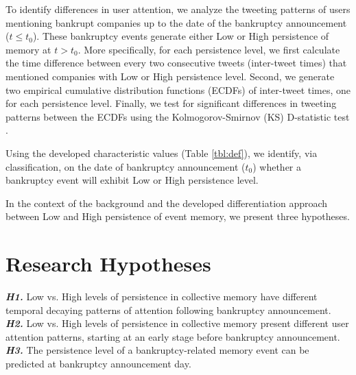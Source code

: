 \documentclass[9pt,twocolumn,twoside,lineno]{pnas-new}
\begin{document}
To identify differences in user attention, we analyze the tweeting patterns of users mentioning bankrupt companies up to the date of the bankruptcy announcement ($t \leq t_0$).
These bankruptcy events generate either Low or High persistence of memory at $t>t_0$.
More specifically, for each persistence level, we first calculate the time difference between every two consecutive tweets (inter-tweet times) that mentioned companies with Low or High persistence level.
Second, we generate two empirical cumulative distribution functions (ECDFs) of inter-tweet times, one for each persistence level.
Finally, we test for significant differences in tweeting patterns between the ECDFs using the Kolmogorov-Smirnov (KS) D-statistic test \cite{massey1951kolmogorov}.

Using the developed characteristic values (Table \ref{tbl:def}), we identify, via classification, on the date of bankruptcy announcement ($t_0$) whether a bankruptcy event will exhibit Low or High persistence level.

In the context of the background and the developed differentiation approach between Low and High persistence of event memory, we present three hypotheses.

\section*{Research Hypotheses}
\label{sec:hypo}

\textbf{\textit{H1.}} Low vs. High levels of persistence in collective memory have different temporal decaying patterns of attention following bankruptcy announcement.
\\
\textbf{\textit{H2.}} Low vs. High levels of persistence in collective memory present different user attention patterns, starting at an early stage before bankruptcy announcement.
\\
\textbf{\textit{H3.}} The persistence level of a bankruptcy-related memory event can be predicted at bankruptcy announcement day.


\showacknow{} %

\newpage
\onecolumn

\end{document}
